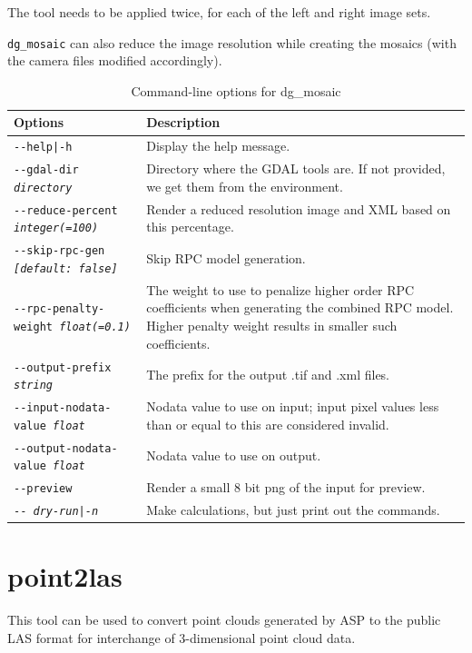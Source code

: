 The tool needs to be applied twice, for each of the left and right image sets.

\texttt{dg\_mosaic} can also reduce the image resolution while creating the
mosaics (with the camera files modified accordingly).


\begin{longtable}{|l|p{10cm}|}
\caption{Command-line options for dg\_mosaic}
\label{tbl:dgmosaic}
\endfirsthead
\endhead
\endfoot
\endlastfoot
\hline
Options & Description \\ \hline \hline
\texttt{-\/-help|-h} & Display the help message.\\ \hline
\texttt{-\/-gdal-dir \textit{directory}} &
Directory where the GDAL tools are. If not provided, we get them from the environment. \\ \hline
\texttt{-\/-reduce-percent \textit{integer(=100)}} &
Render a reduced resolution image and XML based on this percentage. \\ \hline
\texttt{-\/-skip-rpc-gen \textit{[default: false]}} &
Skip RPC model generation.\\ \hline
\texttt{-\/-rpc-penalty-weight \textit{float(=0.1)}} &
The weight to use to penalize higher order RPC coefficients when generating the combined RPC model. Higher penalty weight results in smaller such coefficients.\\ \hline
\texttt{-\/-output-prefix \textit{string}} & The prefix for the output .tif and .xml files. \\ \hline
\texttt{-\/-input-nodata-value \textit{float}} & Nodata value to use on input; input pixel values less than or equal to this are considered invalid. \\ \hline
\texttt{-\/-output-nodata-value \textit{float}} & Nodata value to use on output. \\ \hline

\texttt{-\/-preview } & Render a small 8 bit png of the input for preview. \\ \hline
\texttt{-\/- \textit{dry-run|-n}} & Make calculations, but just print out the commands. \\ \hline
\end{longtable}

\section{point2las}
\label{point2las}

This tool can be used to convert point clouds generated by ASP to the
public LAS format for interchange of 3-dimensional point cloud data.

